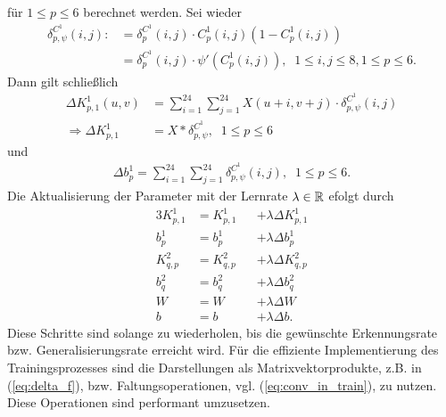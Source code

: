 für $1 \leq p \leq 6$ berechnet werden. Sei wieder
\begin{align*}
    \delta^{C^1}_{p,\psi}(i,j):&= \delta^{C^1}_p(i,j) \cdot C_p^1(i,j)\left(1- C_p^1(i,j)\right)\\
    &= \delta^{C^1}_p(i,j) \cdot \psi'(C^1_p(i,j)), \; \; 1 \leq i,j \leq 8, 1 \leq p \leq 6.
\end{align*}
Dann gilt schließlich
\begin{align*}
    \Delta K^1_{p,1}(u,v) &= \sum_{i=1}^{24} \sum_{j=1}^{24} X(u+i,v+j) \cdot \delta^{C^1}_{p,\psi}(i,j) \\
     \Rightarrow \Delta K_{p,1}^1 &=  X \ast \delta^{C^1}_{p,\psi} , \; \; 1 \leq p \leq 6
\end{align*} und 
\begin{align*}
    \Delta b_p^1 = \sum_{i=1}^{24} \sum_{j=1}^{24} \delta_{p, \psi}^{C^1}(i,j), \; \; 1 \leq p \leq 6.
\end{align*}
Die Aktualisierung der Parameter mit der Lernrate $\lambda \in \mathbb{R}$ efolgt durch
\begin{alignat*}{3}
    K^{1}_{p,1}&=K^{1}_{p,1} &&+ \lambda \Delta K^1_{p,1} \\
    b^{1}_{p}&=b^{1}_{p} &&+ \lambda \Delta b^1_{p} \\
    K^{2}_{q,p}&=K^{2}_{q,p} &&+ \lambda \Delta K^2_{q,p} \\
    b^{2}_{q}&=b^{2}_{q} &&+ \lambda \Delta b^2_{q} \\
    W&=W &&+ \lambda \Delta W \\
    b&=b&&+ \lambda \Delta b.
\end{alignat*}
Diese Schritte sind solange zu wiederholen, bis die gewünschte Erkennungsrate bzw. Generalisierungsrate erreicht wird. Für die effiziente Implementierung des Trainingsprozesses sind die Darstellungen als Matrixvektorprodukte, z.B. in (\ref{eq:delta_f}), bzw. Faltungsoperationen, vgl. (\ref{eq:conv_in_train}), zu nutzen. Diese Operationen sind performant umzusetzen.

